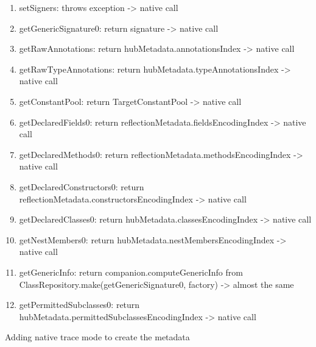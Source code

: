\begin{enumerate}
    \item setSigners: throws exception -> native call
    \item getGenericSignature0: return signature -> native call
    \item getRawAnnotations: return hubMetadata.annotationsIndex -> native call
    \item getRawTypeAnnotations: return hubMetadata.typeAnnotationsIndex -> native call
    \item getConstantPool: return TargetConstantPool -> native call
    
    \item getDeclaredFields0: return reflectionMetadata.fieldsEncodingIndex -> native call
    \item getDeclaredMethods0: return reflectionMetadata.methodsEncodingIndex -> native call
    \item getDeclaredConstructors0: return reflectionMetadata.constructorsEncodingIndex -> native call
    \item getDeclaredClasses0: return hubMetadata.classesEncodingIndex -> native call
    \item getNestMembers0: return hubMetadata.nestMembersEncodingIndex -> native call
    \item getGenericInfo: return companion.computeGenericInfo from ClassRepository.make(getGenericSignature0, factory) -> almost the same
    \item getPermittedSubclasses0: return hubMetadata.permittedSubclassesEncodingIndex -> native call
    
\end{enumerate}

Adding native trace mode to create the metadata

